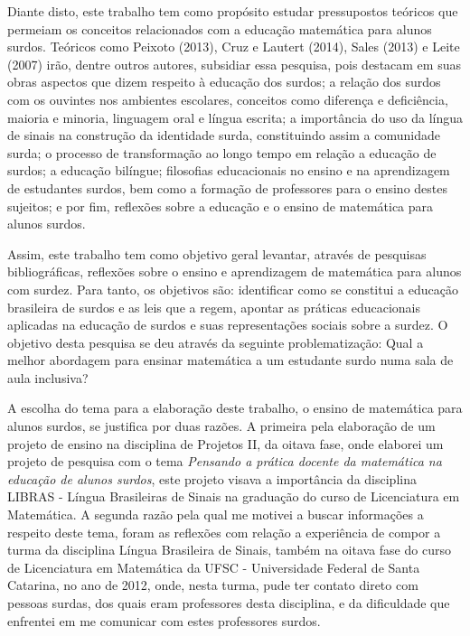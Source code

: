 \documentclass[brasil]{abnt}
\begin{document}
	Diante disto, este trabalho tem como propósito estudar pressupostos 
	teóricos que permeiam os conceitos relacionados com a educação 
	matemática para alunos surdos. Teóricos como Peixoto (2013), Cruz 
	e Lautert (2014), Sales (2013) e Leite (2007) irão, dentre outros autores, subsidiar essa pesquisa, pois destacam em suas obras aspectos que dizem respeito à educação dos surdos; a relação dos surdos com os ouvintes nos ambientes 
	escolares, conceitos como diferença e deficiência, maioria e minoria, linguagem oral e língua escrita; a importância do uso da língua de sinais na construção da identidade surda, constituindo assim a comunidade
	surda; o processo de transformação ao longo tempo em relação a educação de surdos; a educação bilíngue; filosofias educacionais no ensino e na aprendizagem de estudantes surdos, bem como a formação de professores para 
	o ensino destes sujeitos; e por fim, reflexões sobre a educação e o ensino de matemática para alunos surdos. 
	
	Assim, este trabalho tem como objetivo geral levantar, através de pesquisas bibliográficas, reflexões sobre o ensino e aprendizagem de matemática para alunos com surdez. 
	Para tanto, os objetivos são: identificar como se constitui a educação brasileira de surdos e as leis que a regem,  apontar as práticas educacionais aplicadas na educação de surdos e suas representações sociais sobre a 
	surdez. O objetivo desta pesquisa se deu através da seguinte problematização: Qual a melhor abordagem para ensinar matemática a um estudante surdo numa sala de aula inclusiva?  
	
	A escolha do tema para a elaboração deste trabalho, o ensino de matemática para alunos surdos, se justifica por duas razões. A primeira pela elaboração de um projeto de ensino na 
	disciplina de Projetos II, da oitava fase, onde elaborei um projeto de pesquisa com o tema \textit{Pensando a prática docente da matemática na educação de alunos surdos}, este projeto visava a importância 
	da disciplina LIBRAS - Língua Brasileiras de Sinais na graduação do curso de Licenciatura em Matemática. A segunda razão pela qual me motivei a buscar informações a respeito deste tema, foram as reflexões 
	com relação a experiência de compor a turma da disciplina Língua Brasileira de Sinais, também na oitava fase do curso de Licenciatura em Matemática da UFSC - Universidade Federal de Santa Catarina, no ano 
	de 2012, onde, nesta turma, pude ter contato direto com pessoas surdas, dos quais eram professores desta disciplina, e da dificuldade que enfrentei em me comunicar com estes professores surdos. 
	
\end{document}
